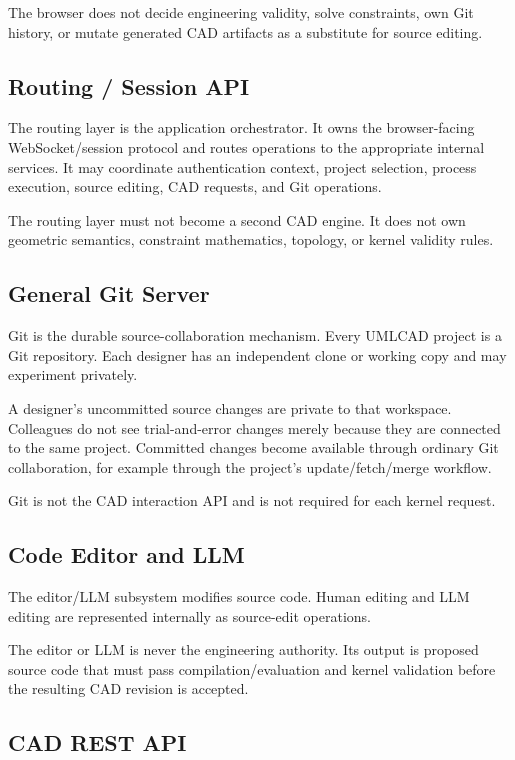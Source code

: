 \documentclass[11pt,a4paper]{article}
\begin{document}
The browser does not decide engineering validity, solve constraints, own Git history, or mutate generated CAD artifacts as a substitute for source editing.

\subsection{Routing / Session API}

The routing layer is the application orchestrator. It owns the browser-facing WebSocket/session protocol and routes operations to the appropriate internal services. It may coordinate authentication context, project selection, process execution, source editing, CAD requests, and Git operations.

The routing layer must not become a second CAD engine. It does not own geometric semantics, constraint mathematics, topology, or kernel validity rules.

\subsection{General Git Server}

Git is the durable source-collaboration mechanism. Every UMLCAD project is a Git repository. Each designer has an independent clone or working copy and may experiment privately.

A designer's uncommitted source changes are private to that workspace. Colleagues do not see trial-and-error changes merely because they are connected to the same project. Committed changes become available through ordinary Git collaboration, for example through the project's update/fetch/merge workflow.

Git is not the CAD interaction API and is not required for each kernel request.

\subsection{Code Editor and LLM}

The editor/LLM subsystem modifies source code. Human editing and LLM editing are represented internally as source-edit operations.

The editor or LLM is never the engineering authority. Its output is proposed source code that must pass compilation/evaluation and kernel validation before the resulting CAD revision is accepted.

\subsection{CAD REST API}
\end{document}
